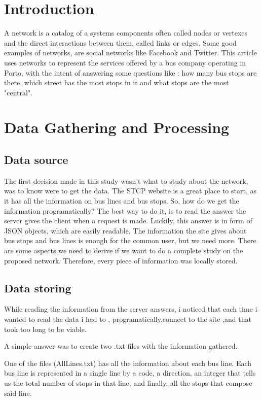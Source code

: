 \documentclass[12pt]{article}
\begin{document}
\begin{multicols}{2}
\section{Introduction}

A network is a catalog of a system\textsc{}s components often called nodes or vertexes and the direct interactions between them, called links or edges.
Some good examples of networks, are social networks like Facebook and Twitter.
This article uses networks to represent the services offered by a bus company operating in Porto, with the intent of answering some questions like : how many bus stops are there, which street has the most stops in it and what stops are the most "central". 
 

\section{Data Gathering and Processing}

\subsection{Data source}
The first decision made in this study wasn't what to study about the network, was to know were to get the data. 
The STCP website is a great place to start, as it has all the information on bus lines and bus stops. So, how do we get the information programatically?
The best way to do it, is to read the answer the server gives the client when a request is made. Luckily, this answer is in form of JSON objects, which are easily readable.
The information the site gives about bus stops and bus lines is enough for the common user, but we need more. There are some aspects we need to derive if we want to do a complete study on the proposed network. Therefore, every piece of information was locally stored.

\subsection{Data storing}
While reading the information from the server answers, i noticed that each time i wanted to read the data i had to , programatically,connect to the site ,and that took too long to be viable. 

A simple answer was to create two .txt files with the information gathered.

One of the files (AllLines.txt) has all the information about each bus line.
Each bus line is represented in a single line by a code, a direction, an integer that tells us the total number of stops in that line, and finally, all the stops that compose said line.


\end{multicols}
\end{document}
